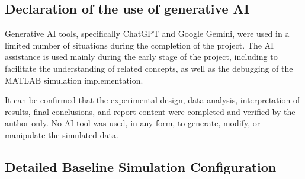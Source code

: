 \documentclass[a4paper,12pt,onecolumn]{article}
\begin{document}
\subsection{Declaration of the use of generative AI}
	\begin{highlightblock}
		Generative AI tools, specifically ChatGPT and Google Gemini, were used in a limited number of situations during the completion of the project. The AI assistance is used mainly during the early stage of the project, including to facilitate the understanding of related concepts, as well as the debugging of the MATLAB simulation implementation.  
		
		It can be confirmed that the experimental design, data analysis, interpretation of results, final conclusions, and report content were completed and verified by the author only. No AI tool was used, in any form, to generate, modify, or manipulate the simulated data.
	\end{highlightblock}
\newpage
\thispagestyle{empty}
\subsection{Detailed Baseline Simulation Configuration}
\end{document}
